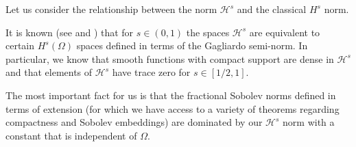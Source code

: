 \documentclass[11pt]{amsart}
\theoremstyle{remark}
\theoremstyle{definition}
\newcommand{\norm}[1]{\left\lVert#1\right\rVert}
\newcommand{\paren}[1]{\left( #1 \right)}
\newcommand{\abs}[1]{\left\lvert #1 \right\rvert}
\DeclareMathOperator{\supp}{supp}
\newcommand{\indic}[1]{\chi_{\{#1\}}}
\newcommand{\HD}{\mathcal{H}}
\newcommand{\Rom}[1]{\MakeUppercase{\romannumeral #1}}
\begin{document}
%
%
%

Let us consider the relationship between the norm $\HD^s$ and the classical $H^s$ norm.  

It is known (see \cite{CoIg.sqg} and \cite{CaSt}) that for $s \in (0,1)$ the spaces $\HD^s$ are equivalent to certain $H^s(\Omega)$ spaces defined in terms of the Gagliardo semi-norm.  In particular, we know that smooth functions with compact support are dense in $\HD^s$ and that elements of $\HD^s$ have trace zero for $s \in [1/2,1]$.  

The most important fact for us is that the fractional Sobolev norms defined in terms of extension (for which we have access to a variety of theorems regarding compactness and Sobolev embeddings) are dominated by our $\HD^s$ norm with a constant that is independent of $\Omega$.  
\end{document}
